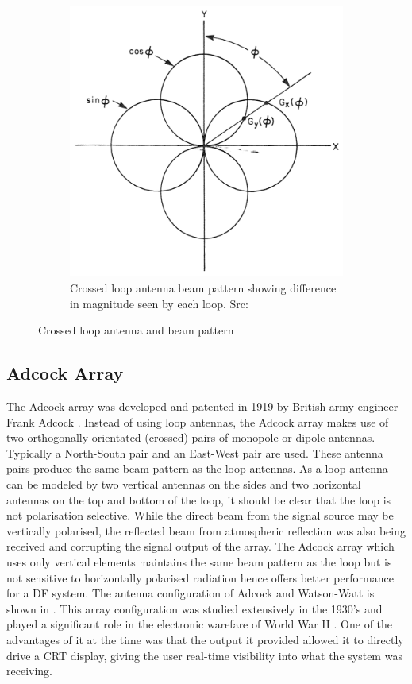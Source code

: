 \begin{figure}
\begin{subfigure}[b]{0.4\textwidth}
    \includegraphics[width=\textwidth]{./img/lit_review/loop_antenna_crossed_beam}
    \caption{Crossed loop antenna beam pattern showing difference in magnitude seen by each loop. Src: \cite{jenkins1991smallaperture}}
  \end{subfigure}
  \caption{Crossed loop antenna and beam pattern}
  \label{fig:lit_crossed_loop_antenna}
\end{figure}

\subsection{Adcock Array}
The Adcock array was developed and patented in 1919 by British army engineer Frank Adcock \cite{gething1991radio}.
Instead of using loop antennas, the Adcock array makes use of two orthogonally orientated (crossed) pairs of monopole or dipole antennas. Typically a North-South pair and an East-West pair are used. These antenna pairs produce the same beam pattern as the loop antennas. 
As a loop antenna can be modeled by two vertical antennas on the sides and two horizontal antennas on the top and bottom of the loop, it should be clear that the loop is not polarisation selective. While the direct beam from the signal source may be vertically polarised, the reflected beam from atmospheric reflection was also being received and corrupting the signal output of the array.
The Adcock array which uses only vertical elements maintains the same beam pattern as the loop but is not sensitive to horizontally polarised radiation hence offers better performance for a DF system.
The antenna configuration of Adcock and Watson-Watt is shown in .
This array configuration was studied extensively in the 1930's and played a significant role in the electronic warefare of World War II \cite{gething1991radio}. One of the advantages of it at the time was that the output it provided allowed it to directly drive a CRT display, giving the user real-time visibility into what the system was receiving\cite{jenkins1991smallaperture}. 

